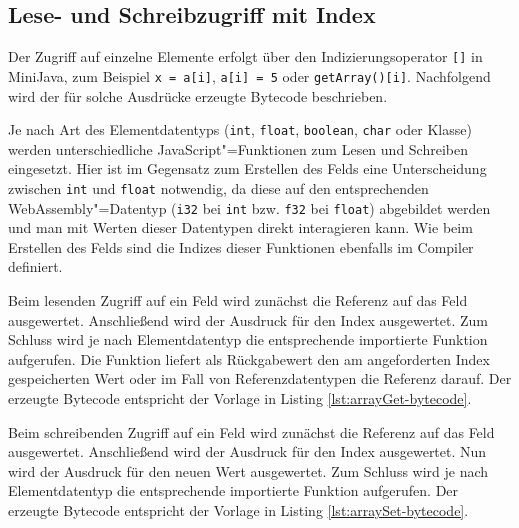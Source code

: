 \subsection{Lese- und Schreibzugriff mit Index}
\label{subsec:Lese-und-Schreibzugriff-mit-Index}

Der Zugriff auf einzelne Elemente erfolgt über den Indizierungsoperator \lstinline{[]} in MiniJava, zum Beispiel \lstinline{x = a[i]}, \lstinline{a[i] = 5} oder \lstinline{getArray()[i]}. Nachfolgend wird der für solche Ausdrücke erzeugte Bytecode beschrieben.

Je nach Art des Elementdatentyps (\lstinline{int}, \lstinline{float}, \lstinline{boolean}, \lstinline{char} oder Klasse) werden unterschiedliche JavaScript"=Funktionen zum Lesen und Schreiben eingesetzt. Hier ist im Gegensatz zum Erstellen des Felds eine Unterscheidung zwischen \lstinline{int} und \lstinline{float} notwendig, da diese auf den entsprechenden WebAssembly"=Datentyp (\lstinline{i32} bei \lstinline{int} bzw. \lstinline{f32} bei \lstinline{float}) abgebildet werden und man mit Werten dieser Datentypen direkt interagieren kann. Wie beim Erstellen des Felds sind die Indizes dieser Funktionen ebenfalls im Compiler definiert.

Beim lesenden Zugriff auf ein Feld wird zunächst die Referenz auf das Feld ausgewertet. Anschließend wird der Ausdruck für den Index ausgewertet. Zum Schluss wird je nach Elementdatentyp die entsprechende importierte Funktion aufgerufen. Die Funktion liefert als Rückgabewert den am angeforderten Index gespeicherten Wert oder im Fall von Referenzdatentypen die Referenz darauf. Der erzeugte Bytecode entspricht der Vorlage in Listing \ref{lst:arrayGet-bytecode}.



Beim schreibenden Zugriff auf ein Feld wird zunächst die Referenz auf das Feld ausgewertet. Anschließend wird der Ausdruck für den Index ausgewertet. Nun wird der Ausdruck für den neuen Wert ausgewertet. Zum Schluss wird je nach Elementdatentyp die entsprechende importierte Funktion aufgerufen. Der erzeugte Bytecode entspricht der Vorlage in Listing \ref{lst:arraySet-bytecode}.



